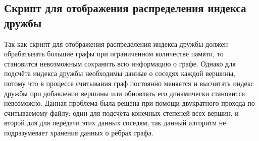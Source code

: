 \documentclass[bachelor, och, diploma]{SCWorks}
\begin{document}
\subsection{Скрипт для отображения распределения индекса дружбы}
Так как скрипт для отображения распределения индекса дружбы должен обрабатывать большие графы при ограниченном количестве памяти, то становится невозможным сохранить всю информацию о графе. Однако для подсчёта индекса дружбы необходимы данные о соседях каждой вершины, потому что в процессе считывания граф постоянно меняется и высчитать индекс дружбы при добавлении вершины или обновлять его динамически становится невозможно. Данная проблема была решена при помощи двукратного прохода по считываемому файлу: один для подсчёта конечных степеней всех вершин, и второй для для передачи этих данных соседям, так данный алгоритм не подразумевает хранения данных о рёбрах графа.
\end{document}
